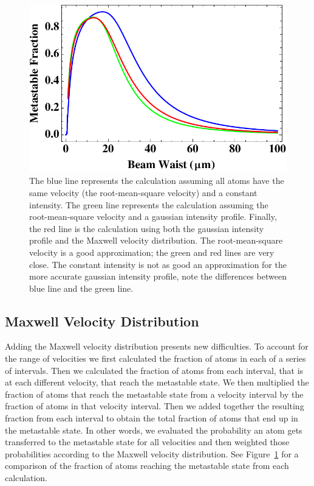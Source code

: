 \documentclass[prb,preprint]{revtex4-1}
\begin{document}
\begin{figure}[h!]
\centering
\includegraphics[width=6in]{AllGraph.pdf}
\caption{The blue line represents the calculation assuming all atoms have the same velocity (the root-mean-square velocity) and a constant intensity. The green line represents the calculation assuming the root-mean-square velocity and a gaussian intensity profile. Finally, the red line is the calculation using both the gaussian intensity profile and the Maxwell velocity distribution. The root-mean-square velocity is a good approximation; the green and red lines are very close. The constant intensity is not as good an approximation for the more accurate gaussian intensity profile, note the differences between blue line and the green line.}
\label{AllGraph}
\end{figure}


\subsection{Maxwell Velocity Distribution}

Adding the Maxwell velocity distribution presents new difficulties. To account for the range of velocities we first calculated the fraction of atoms in each of a series of intervals. Then we calculated the fraction of atoms from each interval, that is at each different velocity, that reach the metastable state. We then multiplied the fraction of atoms that reach the metastable state from a velocity interval by the fraction of atoms in that velocity interval. Then we added together the resulting fraction from each interval to obtain the total fraction of atoms that end up in the metastable state.  In other words, we evaluated the probability an atom gets transferred to the metastable state for all velocities and then weighted those probabilities according to the Maxwell velocity distribution.  See Figure~\ref{AllGraph} for a comparison of the fraction of atoms reaching the metastable state from each calculation.
\end{document}
